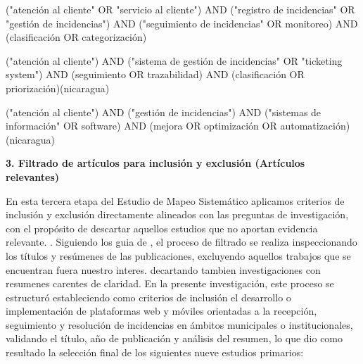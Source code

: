 ("atención al cliente" OR "servicio al cliente") AND ("registro de incidencias" OR "gestión de incidencias") AND ("seguimiento de incidencias" OR monitoreo) AND (clasificación OR categorización)

("atención al cliente") AND ("sistema de gestión de incidencias" OR "ticketing system") AND (seguimiento OR trazabilidad) AND (clasificación OR priorización)(nicaragua)

("atención al cliente") AND ("gestión de incidencias") AND ("sistemas de información" OR software) AND (mejora OR optimización OR automatización)(nicaragua)


\textbf{3. Filtrado de artículos para inclusión y exclusión (Artículos relevantes)}

En esta tercera etapa del Estudio de Mapeo Sistemático aplicamos criterios de inclusión y exclusión directamente alineados con las preguntas de investigación, con el propósito de descartar aquellos estudios que no aportan evidencia relevante. \cite{petersen2008systematic}. Siguiendo los guia de \textcite{petersen2008systematic}, el proceso de filtrado se realiza inspeccionando  los títulos y resúmenes de las publicaciones, excluyendo aquellos trabajos que se encuentran fuera nuestro interes. decartando tambien investigaciones con resumenes carentes de claridad. En la presente investigación, este proceso se estructuró estableciendo como criterios de inclusión el desarrollo o implementación de plataformas web y móviles orientadas a la recepción, seguimiento y resolución de incidencias en ámbitos municipales o institucionales, validando el título, año de publicación y análisis del resumen, lo que dio como resultado la selección final de los siguientes nueve estudios primarios:

